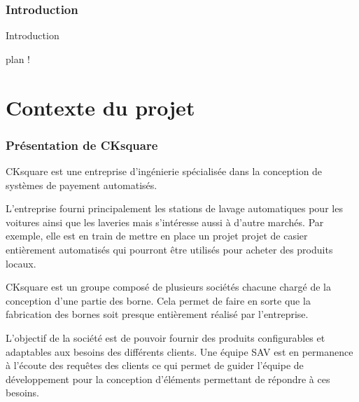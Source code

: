 \documentclass[a4paper]{article}
\begin{document}
\clearpage{}

\pagestyle{plain}
\setcounter{page}{1}
\clearpage
\section*{Introduction}

Introduction

plan !

\clearpage{}



\part{Contexte du projet}

\section{Présentation de CKsquare}

CKsquare est une entreprise d'ingénierie spécialisée dans la conception de
systèmes de payement automatisés.

L'entreprise fourni principalement les stations de lavage automatiques pour les
voitures ainsi que les laveries mais s'intéresse aussi à d'autre marchés. Par
exemple, elle est en train de mettre en place un projet projet de casier
entièrement automatisés qui pourront être utilisés pour acheter des produits
locaux.

CKsquare est un groupe composé de plusieurs sociétés chacune chargé de la
conception d'une partie des borne. Cela permet de faire en sorte que la
fabrication des bornes soit presque entièrement réalisé par l'entreprise.

L'objectif de la société est de pouvoir fournir des produits configurables et
adaptables aux besoins des différents clients. Une équipe SAV est en permanence
à l'écoute des requêtes des clients ce qui permet de guider l'équipe de
développement pour la conception d'éléments permettant de répondre à ces
besoins.
\end{document}
